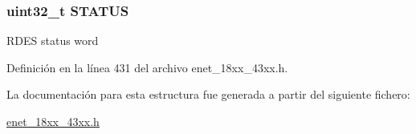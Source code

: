 \subsubsection[{\texorpdfstring{S\+T\+A\+T\+US}{STATUS}}]{ uint32\+\_\+t S\+T\+A\+T\+US}\hypertarget{struct_e_n_e_t___r_x_d_e_s_c___t_a0b3f4c41f87ca52c3b6bca0bafa0df6b}{}\label{struct_e_n_e_t___r_x_d_e_s_c___t_a0b3f4c41f87ca52c3b6bca0bafa0df6b}
R\+D\+ES status word 

Definición en la línea 431 del archivo enet\+\_\+18xx\+\_\+43xx.\+h.



La documentación para esta estructura fue generada a partir del siguiente fichero\+:\begin{DoxyCompactItemize}
\item 
\hyperlink{enet__18xx__43xx_8h}{enet\+\_\+18xx\+\_\+43xx.\+h}\end{DoxyCompactItemize}
